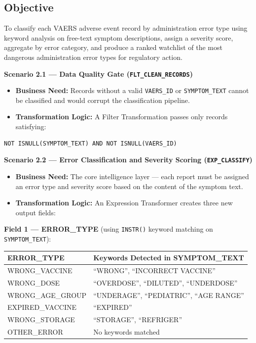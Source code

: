 \documentclass[12pt,a4paper]{report}
\begin{document}
\subsection*{Objective}
To classify each VAERS adverse event record by administration error type using keyword analysis on free-text symptom descriptions, assign a severity score, aggregate by error category, and produce a ranked watchlist of the most dangerous administration error types for regulatory action.

\bigskip

\noindent\textbf{Scenario 2.1 — Data Quality Gate (\texttt{FLT\_CLEAN\_RECORDS})}

\begin{itemize}[leftmargin=*]
  \item \textbf{Business Need:} Records without a valid \texttt{VAERS\_ID} or \texttt{SYMPTOM\_TEXT} cannot be classified and would corrupt the classification pipeline.
  \item \textbf{Transformation Logic:} A Filter Transformation passes only records satisfying:
\end{itemize}

\begin{lstlisting}
NOT ISNULL(SYMPTOM_TEXT) AND NOT ISNULL(VAERS_ID)
\end{lstlisting}

\bigskip

\noindent\textbf{Scenario 2.2 — Error Classification and Severity Scoring (\texttt{EXP\_CLASSIFY})}

\begin{itemize}[leftmargin=*]
  \item \textbf{Business Need:} The core intelligence layer — each report must be assigned an error type and severity score based on the content of the symptom text.
  \item \textbf{Transformation Logic:} An Expression Transformer creates three new output fields:
\end{itemize}

\textbf{Field 1 — ERROR\_TYPE} (using \texttt{INSTR()} keyword matching on \texttt{SYMPTOM\_TEXT}):

\begin{center}
\begin{tabular}{ll}
\toprule
\textbf{ERROR\_TYPE}  & \textbf{Keywords Detected in SYMPTOM\_TEXT} \\
\midrule
WRONG\_VACCINE    & ``WRONG'', ``INCORRECT VACCINE'' \\
WRONG\_DOSE       & ``OVERDOSE'', ``DILUTED'', ``UNDERDOSE'' \\
WRONG\_AGE\_GROUP & ``UNDERAGE'', ``PEDIATRIC'', ``AGE RANGE'' \\
EXPIRED\_VACCINE  & ``EXPIRED'' \\
WRONG\_STORAGE    & ``STORAGE'', ``REFRIGER'' \\
OTHER\_ERROR      & No keywords matched \\
\bottomrule
\end{tabular}
\end{center}
\end{document}

